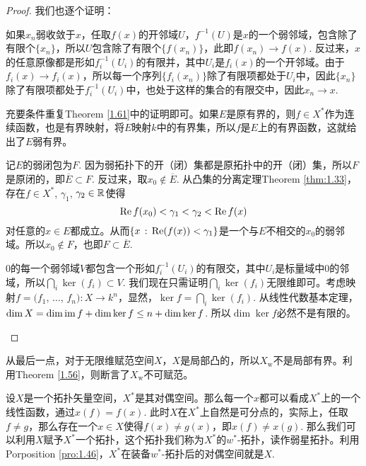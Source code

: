 \begin{proof}
我们也逐个证明：
\begin{compactenum}[~~~(1)]
\item 如果$x_n$弱收敛于$x$，任取$f(x)$的开邻域$U$，$f^{-1}(U)$是$x$的一个弱邻域，包含除了有限个$\{x_n\}$，所以$U$包含除了有限个$\{f(x_n)\}$，此即$f(x_n)\to f(x)$. 反过来，$x$的任意原像都是形如$f_i^{-1}(U_i)$的有限并，其中$U_i$是$f_i(x)$的一个开邻域。由于$f_i(x)\to f_i(x)$，所以每一个序列$\{f_i(x_n)\}$除了有限项都处于$U_i$中，因此$\{x_n\}$除了有限项都处于$f_i^{-1}(U_i)$中，也处于这样的集合的有限交中，因此$x_n\to x$.
\item 充要条件重复Theorem \ref{1.61}中的证明即可。如果$E$是原有界的，则$f\in X^*$作为连续函数，也是有界映射，将$E$映射$k$中的有界集，所以$f$是$E$上的有界函数，这就给出了$E$弱有界。
\item 记$E$的弱闭包为$F$. 因为弱拓扑下的开（闭）集都是原拓扑中的开（闭）集，所以$F$是原闭的，即$\overline{E}\subset F$. 反过来，取$x_0\not\in \overline{E}$. 从凸集的分离定理Theorem \ref{thm:1.33}，存在$f\in X^*$, $\gamma_1$, $\gamma_2\in \mathbb{R}$使得
\[
	\operatorname{Re} f(x_0) < \gamma_1 < \gamma_2 < \operatorname{Re} f(x)
\]
对任意的$x\in E$都成立。从而$\{x\,:\,\operatorname{Re}(f(x))<\gamma_1\}$是一个与$E$不相交的$x_0$的弱邻域。所以$x_0\not\in F$，也即$F\subset \overline{E}$.
\item $0$的每一个弱邻域$V$都包含一个形如$f_i^{-1}(U_i)$的有限交，其中$U_i$是标量域中$0$的邻域，所以$\bigcap_i\ker(f_i)\subset V$. 我们现在只需证明$\bigcap_i\ker(f_i)$无限维即可。考虑映射$f=(f_1$, $\dots$, $f_n):X\to k^n$，显然，$\ker f= \bigcap_i\ker(f_i)$. 从线性代数基本定理，$\dim X= \dim\operatorname{im} f+\dim\ker f\leq n+\dim\ker f$. 所以$\dim \ker f$必然不是有限的。
\end{compactenum}
\end{proof}

从最后一点，对于无限维赋范空间$X$，$X$是局部凸的，所以$X_{\text{w}}$不是局部有界。利用Theorem \ref{1.56}，则断言了$X_{\text{w}}$不可赋范。

\begin{para}[$w^*$-拓扑]
设$X$是一个拓扑矢量空间，$X^*$是其对偶空间。那么每一个$x$都可以看成$X^*$上的一个线性函数，通过$x(f)=f(x)$. 此时$X$在$X^*$上自然是可分点的，实际上，任取$f\neq g$，那么存在一个$x\in X$使得$f(x)\neq g(x)$，即$x(f)\neq x(g)$. 那么我们可以利用$X$赋予$X^*$一个拓扑，这个拓扑我们称为$X^*$的$w^*$-拓扑，读作弱星拓扑。利用Porposition \ref{pro:1.46}，$X^*$在装备$w^*$-拓扑后的对偶空间就是$X$.
\end{para}